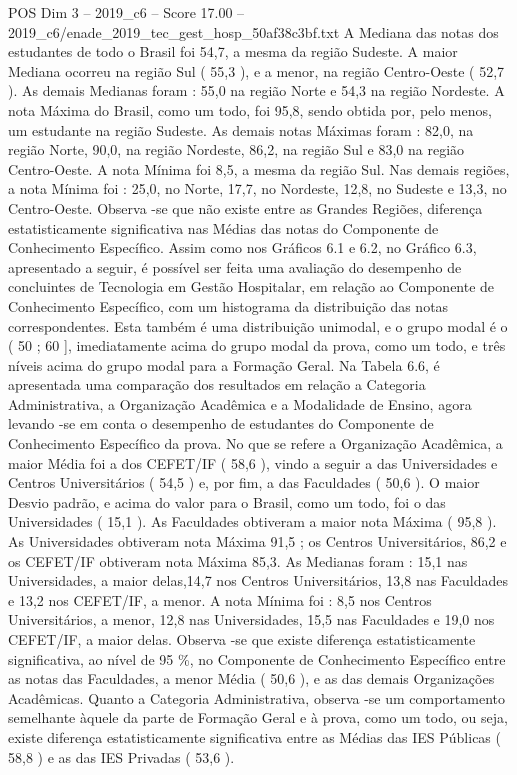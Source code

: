 \begin{textsample}{POS Dim 3 – 2019\_c6 – Score 17.00 – 2019\_c6/enade\_2019\_tec\_gest\_hosp\_50af38c3bf.txt}
A Mediana das notas dos estudantes de todo o Brasil foi 54,7, a mesma da região Sudeste.
A maior Mediana ocorreu na região Sul ( 55,3 ), e a menor, na região Centro-Oeste ( 52,7 ).
As demais Medianas foram : 55,0 na região Norte e 54,3 na região Nordeste.
A nota Máxima do Brasil, como um todo, foi 95,8, sendo obtida por, pelo menos, um estudante na região Sudeste.
As demais notas Máximas foram : 82,0, na região Norte, 90,0, na região Nordeste, 86,2, na região Sul e 83,0 na região Centro-Oeste.
A nota Mínima foi 8,5, a mesma da região Sul.
Nas demais regiões, a nota Mínima foi : 25,0, no Norte, 17,7, no Nordeste, 12,8, no Sudeste e 13,3, no Centro-Oeste.
Observa -se que não existe entre as Grandes Regiões, diferença estatisticamente significativa nas Médias das notas do Componente de Conhecimento Específico.
Assim como nos Gráficos 6.1 e 6.2, no Gráfico 6.3, apresentado a seguir, é possível ser feita uma avaliação do desempenho de concluintes de Tecnologia em Gestão Hospitalar, em relação ao Componente de Conhecimento Específico, com um histograma da distribuição das notas correspondentes.
Esta também é uma distribuição unimodal, e o grupo modal é o ( 50 ; 60 ], imediatamente acima do grupo modal da prova, como um todo, e três níveis acima do grupo modal para a Formação Geral.
Na Tabela 6.6, é apresentada uma comparação dos resultados em relação a Categoria Administrativa, a Organização Acadêmica e a Modalidade de Ensino, agora levando -se em conta o desempenho de estudantes do Componente de Conhecimento Específico da prova.
No que se refere a Organização Acadêmica, a maior Média foi a dos CEFET/IF ( 58,6 ), vindo a seguir a das Universidades e Centros Universitários ( 54,5 ) e, por fim, a das Faculdades ( 50,6 ).
O maior Desvio padrão, e acima do valor para o Brasil, como um todo, foi o das Universidades ( 15,1 ).
As Faculdades obtiveram a maior nota Máxima ( 95,8 ).
As Universidades obtiveram nota Máxima 91,5 ; os Centros Universitários, 86,2 e os CEFET/IF obtiveram nota Máxima 85,3.
As Medianas foram : 15,1 nas Universidades, a maior delas,14,7 nos Centros Universitários, 13,8 nas Faculdades e 13,2 nos CEFET/IF, a menor.
A nota Mínima foi : 8,5 nos Centros Universitários, a menor, 12,8 nas Universidades, 15,5 nas Faculdades e 19,0 nos CEFET/IF, a maior delas.
Observa -se que existe diferença estatisticamente significativa, ao nível de 95 \%, no Componente de Conhecimento Específico entre as notas das Faculdades, a menor Média ( 50,6 ), e as das demais Organizações Acadêmicas.
Quanto a Categoria Administrativa, observa -se um comportamento semelhante àquele da parte de Formação Geral e à prova, como um todo, ou seja, existe diferença estatisticamente significativa entre as Médias das IES Públicas ( 58,8 ) e as das IES Privadas ( 53,6 ).

\end{textsample}
